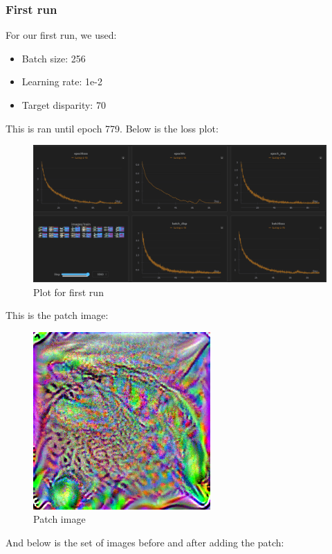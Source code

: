 \documentclass[conference]{IEEEtran}
\begin{document}
\subsubsection{First run}
For our first run, we used:
\begin{itemize}
  \item Batch size: 256
  \item Learning rate: 1e-2
  \item Target disparity: 70
\end{itemize}

This is ran until epoch 779. Below is the loss plot:
\begin{figure}[!h]
    \centering
    \includegraphics[scale=0.2]{./images/results/run1.png}
    \caption{Plot for first run}
  \end{figure} 

This is the patch image:
\begin{figure}[!h]
  \centering
  \includegraphics[scale=0.5]{./images/results/epoch_779_patch.png}
  \caption{Patch image}
\end{figure} 

And below is the set of images before and after adding the patch:
\end{document}
